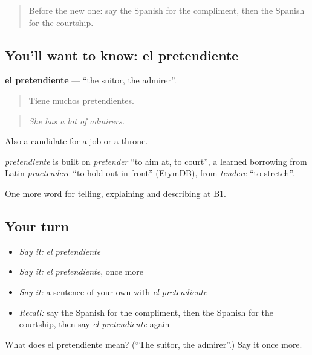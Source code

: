 \begin{quote}
Before the new one: say the Spanish for the compliment, then the Spanish for the courtship.
\end{quote}

\subsection*{You'll want to know: el pretendiente}
\textbf{el pretendiente} — \textquotedblleft{}the suitor, the admirer\textquotedblright{}.

\begin{quote}
Tiene muchos pretendientes.
\end{quote}

\begin{quote}
\emph{She has a lot of admirers.}
\end{quote}

Also a candidate for a job or a throne.

\begin{cousinweb}
\emph{pretendiente} is built on \emph{pretender} \textquotedblleft{}to aim at, to court\textquotedblright{}, a learned borrowing from Latin \emph{praetendere} \textquotedblleft{}to hold out in front\textquotedblright{} (EtymDB), from \emph{tendere} \textquotedblleft{}to stretch\textquotedblright{}.
\end{cousinweb}

\begin{grammarlens}[title={What you've built}]
One more word for telling, explaining and describing at B1.
\end{grammarlens}

\subsection*{Your turn}
\begin{itemize}
\raggedright
  \item \emph{Say it:} \emph{el pretendiente}
  \item \emph{Say it:} \emph{el pretendiente}, once more
  \item \emph{Say it:} a sentence of your own with \emph{el pretendiente}
  \item \emph{Recall:} say the Spanish for the compliment, then the Spanish for the courtship, then say \emph{el pretendiente} again
\end{itemize}

\begin{tcolorbox}[breakable,colback=teal!4,colframe=teal!35!black,title={Before you move on}]
What does el pretendiente mean? (\textquotedblleft{}The suitor, the admirer\textquotedblright{}.) Say it once more.
\end{tcolorbox}
